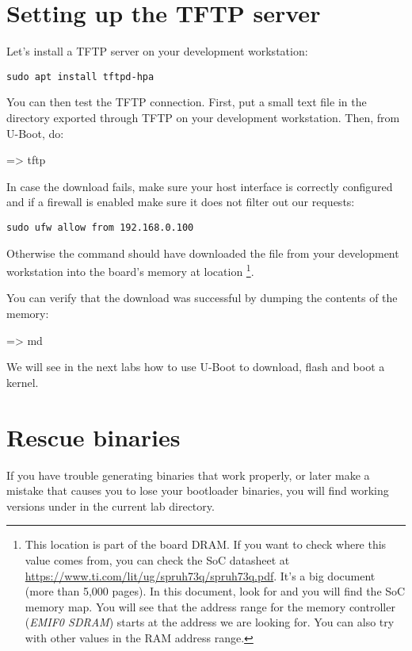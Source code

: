
\section{Setting up the TFTP server}

Let's install a TFTP server on your development workstation:

\begin{verbatim}
sudo apt install tftpd-hpa
\end{verbatim}

You can then test the TFTP connection. First, put a small text file in
the directory exported through TFTP on your development
workstation. Then, from U-Boot, do:

\begin{ubootinput}
=> tftp %
\end{ubootinput}

In case the download fails, make sure your host interface is correctly
configured and if a firewall is enabled make sure it does not filter out our
requests:
\begin{verbatim}
sudo ufw allow from 192.168.0.100
\end{verbatim}

Otherwise the  command should have downloaded the
 file from your development workstation into
the board's memory at location {\tt \zimageboardaddr}\footnote{
This location is part of the board DRAM. If you want
to check where this value comes from, you can check the SoC
datasheet at
\url{https://www.ti.com/lit/ug/spruh73q/spruh73q.pdf}.
It's a big document (more than 5,000 pages). In this document, look
for  and you will find the SoC memory map.
You will see that the address range for the memory controller
({\em EMIF0 SDRAM})
starts at the address we are looking for.
You can also try with other values in the RAM address range.}.

You can verify that the download was successful by dumping the
contents of the memory:

\begin{ubootinput}
=> md %
\end{ubootinput}

We will see in the next labs how to use U-Boot to download, flash and
boot a kernel.


\section{Rescue binaries}

If you have trouble generating binaries that work properly, or later
make a mistake that causes you to lose your bootloader binaries, you
will find working versions under  in the current lab
directory.
